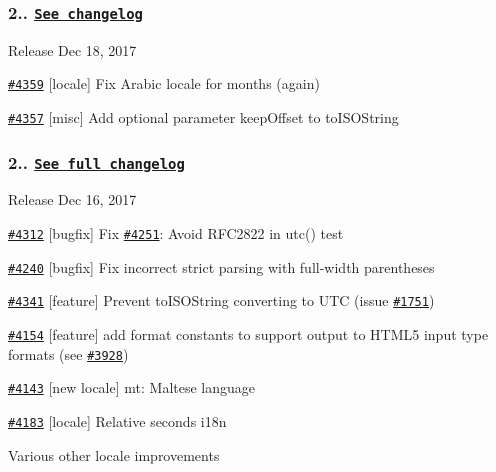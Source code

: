 \subsubsection*{2.. \href{https://gist.github.com/marwahaha/d72c1cb22076373be889b16272cbd187}{\tt See changelog}}


\begin{DoxyItemize}
\item Release Dec 18, 2017
\item \href{https://github.com/moment/moment/pull/4359}{\tt \#4359} \mbox{[}locale\mbox{]} Fix Arabic locale for months (again)
\item \href{https://github.com/moment/moment/pull/4357}{\tt \#4357} \mbox{[}misc\mbox{]} Add optional parameter keep\+Offset to to\+I\+S\+O\+String
\end{DoxyItemize}

\subsubsection*{2.. \href{https://gist.github.com/marwahaha/e0d4135fbf8bb75fa85c4aa2bddc5031}{\tt See full changelog}}


\begin{DoxyItemize}
\item Release Dec 16, 2017
\item \href{https://github.com/moment/moment/pull/4312}{\tt \#4312} \mbox{[}bugfix\mbox{]} Fix \href{https://github.com/moment/moment/pull/4251}{\tt \#4251}\+: Avoid R\+F\+C2822 in utc() test
\item \href{https://github.com/moment/moment/pull/4240}{\tt \#4240} \mbox{[}bugfix\mbox{]} Fix incorrect strict parsing with full-\/width parentheses
\item \href{https://github.com/moment/moment/pull/4341}{\tt \#4341} \mbox{[}feature\mbox{]} Prevent to\+I\+S\+O\+String converting to U\+TC (issue \href{https://github.com/moment/moment/pull/1751}{\tt \#1751})
\item \href{https://github.com/moment/moment/pull/4154}{\tt \#4154} \mbox{[}feature\mbox{]} add format constants to support output to H\+T\+M\+L5 input type formats (see \href{https://github.com/moment/moment/pull/3928}{\tt \#3928})
\item \href{https://github.com/moment/moment/pull/4143}{\tt \#4143} \mbox{[}new locale\mbox{]} mt\+: Maltese language
\item \href{https://github.com/moment/moment/pull/4183}{\tt \#4183} \mbox{[}locale\mbox{]} Relative seconds i18n
\item Various other locale improvements
\end{DoxyItemize}

